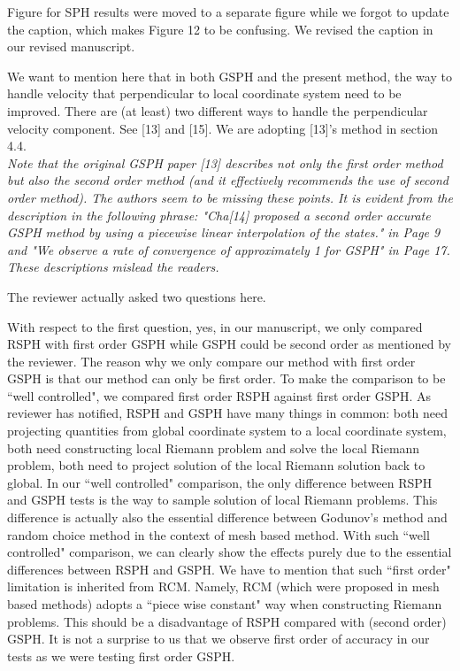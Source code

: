\documentclass[10pt,a4paper]{article}
\begin{document}
Figure for SPH results were moved to a separate figure while we forgot to update the caption, which makes Figure 12 to be confusing. We revised the caption in our revised manuscript. 

We want to mention here that in both GSPH and the present method, the way to handle velocity that perpendicular to local coordinate system need to be improved. There are (at least) two different ways to handle the perpendicular velocity component. See [13] and [15]. We are adopting [13]'s method in section 4.4. 
\\[3pt]


\textit{Note that the original GSPH paper [13] describes not only the first order method but also the second order method (and it effectively recommends the use of second order method). The authors seem to be missing these points. It is evident from the description in the following phrase: "Cha[14] proposed a second order accurate GSPH method by using a piecewise linear interpolation of the states." in Page 9 and "We observe a rate of convergence of approximately 1 for GSPH" in Page 17. These descriptions mislead the readers.}

The reviewer actually asked two questions here.
 
With respect to the first question, yes, in our manuscript, we only compared RSPH with first order GSPH while GSPH could be second order as mentioned by the reviewer. The reason why we only compare our method with first order GSPH is that our method can only be first order. To make the comparison to be ``well controlled", we compared first order RSPH against first order GSPH. As reviewer has notified, RSPH and GSPH have many things in common: both need projecting quantities from global coordinate system to a local coordinate system, both need constructing local Riemann problem and solve the local Riemann problem, both need to project solution of the local Riemann solution back to global. In our ``well controlled" comparison, the only difference between RSPH and GSPH tests is the way to sample solution of local Riemann problems. This difference is actually also the essential difference between Godunov's method and random choice method in the context of mesh based method. With such ``well controlled" comparison, we can clearly show the effects purely due to the essential differences between RSPH and GSPH. We have to mention that such ``first order" limitation is inherited from RCM. Namely, RCM (which were proposed in mesh based methods) adopts a ``piece wise constant" way when constructing Riemann problems. This should be a disadvantage of RSPH compared with (second order) GSPH.
It is not a surprise to us that we observe first order of accuracy in our tests as we were testing first order GSPH.
\end{document}
